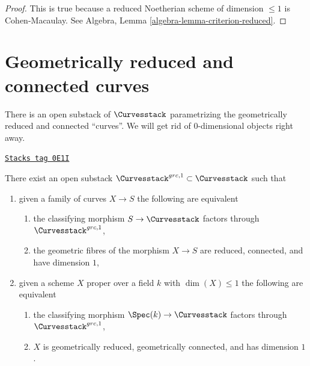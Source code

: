 \begin{proof}
This is true because a reduced Noetherian scheme of
dimension $\leq 1$ is Cohen-Macaulay. See
Algebra, Lemma \ref{algebra-lemma-criterion-reduced}.
\end{proof}

\section{Geometrically reduced and connected curves}
\label{moduli-curves-section-geometrically-reduced-connected}
There is an open substack of $\Curvesstack$ parametrizing
the geometrically reduced and connected ``curves''.
We will get rid of $0$-dimensional objects right away.

\begin{lemma}
\label{moduli-curves-lemma-geometrically-reduced-connected-1-curves}
\href{https://stacks.math.columbia.edu/tag/0E1I}{\texttt{Stacks tag 0E1I}}

There exist an open substack $\Curvesstack^{grc, 1} \subset \Curvesstack$
such that
\begin{enumerate}
\item given a family of curves $X \to S$ the following are equivalent
\begin{enumerate}
\item the classifying morphism $S \to \Curvesstack$ factors
through $\Curvesstack^{grc, 1}$,
\item the geometric fibres of the morphism $X \to S$ are
reduced, connected, and have dimension $1$,
\end{enumerate}
\item given a scheme $X$ proper over a field $k$ with $\dim(X) \leq 1$
the following are equivalent
\begin{enumerate}
\item the classifying morphism $\Spec(k) \to \Curvesstack$ factors
through $\Curvesstack^{grc, 1}$,
\item $X$ is geometrically reduced, geometrically connected,
and has dimension $1$.
\end{enumerate}
\end{enumerate}
\end{lemma}

